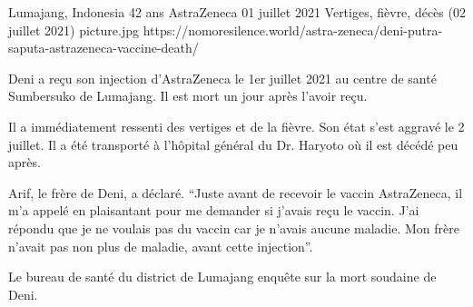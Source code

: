 {Lumajang, Indonesia}
{42 ans}
{AstraZeneca}
{01 juillet 2021}
{Vertiges, fièvre, décès (02 juillet 2021)}
{picture.jpg}
{https://nomoresilence.world/astra-zeneca/deni-putra-saputa-astrazeneca-vaccine-death/}
{

Deni a reçu son injection d'AstraZeneca le 1er juillet 2021 au centre de santé
Sumbersuko de Lumajang. Il est mort un jour après l'avoir reçu.

Il a immédiatement ressenti des vertiges et de la fièvre. Son état s'est aggravé
le 2 juillet. Il a été transporté à l'hôpital général du Dr. Haryoto où il est
décédé peu après.

Arif, le frère de Deni, a déclaré. “Juste avant de recevoir le vaccin
AstraZeneca, il m'a appelé en plaisantant pour me demander si j'avais reçu le
vaccin. J'ai répondu que je ne voulais pas du vaccin car je n'avais aucune
maladie. Mon frère n'avait pas non plus de maladie, avant cette injection”.

Le bureau de santé du district de Lumajang enquête sur la mort soudaine de Deni.

}
